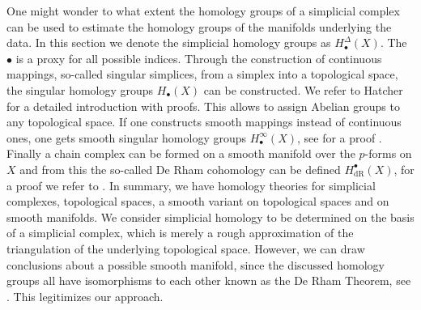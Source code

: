\documentclass[runningheads,orivec]{llncs}
\begin{document}
One might wonder to what extent the homology groups of a simplicial complex can be used to estimate the homology groups of the manifolds underlying the data. In this section we denote the simplicial homology groups as $H^{\Delta}_{\bullet}(X)$. The $\bullet$ is a proxy for all possible indices. Through the construction of continuous mappings, so-called singular simplices, from a simplex into a topological space, the singular homology groups $H_{\bullet}(X)$ can be constructed. We refer to Hatcher \cite[p.~102]{hatcher2002algebraic} for a detailed introduction with proofs. This allows to assign Abelian groups to any topological space. If one constructs smooth mappings instead of continuous ones, one gets smooth singular homology groups $H^{\infty}_{\bullet}(X)$, see for a proof \cite[pp.~473]{lee2013smooth}. Finally a chain complex can be formed on a smooth manifold over the $p$-forms on $X$ and from this the so-called De Rham cohomology can be defined $H_{\text{dR}}^{\bullet}(X)$, for a proof we refer to \cite[pp.~440]{lee2013smooth}. In summary, we have homology theories for simplicial complexes, topological spaces, a smooth variant on topological spaces and on smooth manifolds. We consider simplicial homology to be determined on the basis of a simplicial complex, which is merely a rough approximation of the triangulation of the underlying topological space. However, we can draw conclusions about a possible smooth manifold, since the discussed homology groups all have isomorphisms to each other known as the De Rham Theorem, see \cite[pp.~106, pp.~467]{hatcher2002algebraic,lee2013smooth}. This legitimizes our approach.
\end{document}
